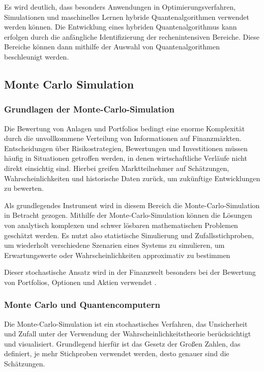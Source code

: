  
Es wird deutlich, dass besonders Anwendungen in Optimierungsverfahren, Simulationen und maschinelles Lernen hybride Quantenalgorithmen verwendet werden können. 
Die Entwicklung eines hybriden Quantenalgorithmus kann erfolgen durch die anfängliche Identifizierung der rechenintensiven Bereiche. Diese Bereiche können dann mithilfe der Auswahl von Quantenalgorithmen beschleunigt werden.

\subsection{ Monte Carlo Simulation}

\subsubsection*{Grundlagen der Monte-Carlo-Simulation}
Die Bewertung von Anlagen und Portfolios bedingt eine enorme Komplexität durch die unvollkommene Verteilung von Informationen auf Finanzmärkten. Entscheidungen über Risikostrategien, Bewertungen und Investitionen müssen häufig in Situationen getroffen werden, in denen wirtschaftliche Verläufe nicht direkt einsichtig sind. Hierbei greifen Marktteilnehmer auf Schätzungen, Wahrscheinlichkeiten und historische Daten zurück, um zukünftige Entwicklungen zu bewerten. 
 
Als grundlegendes Instrument wird in diesem Bereich die Monte-Carlo-Simulation in Betracht gezogen. Mithilfe der Monte-Carlo-Simulation können die Lösungen von analytisch komplexen und schwer lösbaren mathematischen Problemen geschätzt werden. Es nutzt also statistische Simulierung und Zufallsstichproben, um wiederholt verschiedene Szenarien eines Systems zu simulieren, um Erwartungswerte oder Wahrscheinlichkeiten approximativ zu bestimmen

Dieser stochastische Ansatz wird in der Finanzwelt besonders bei der Bewertung von Portfolios, Optionen und Aktien verwendet \cite{orus2019}.

\subsubsection*{Monte Carlo und Quantencomputern}
Die Monte-Carlo-Simulation ist ein stochastisches Verfahren, das Unsicherheit und Zufall unter der Verwendung der Wahrscheinlichkeitstheorie berücksichtigt und visualisiert. Grundlegend hierfür ist das Gesetz der Großen Zahlen, das definiert, je mehr Stichproben verwendet werden, desto genauer sind die Schätzungen. 

